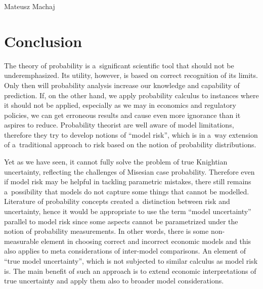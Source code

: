 \begin{artengenv}{Mateusz Machaj}
\section{Conclusion}

The theory of probability is a~significant scientific tool that should not be underemphasized. Its utility, however, is based on correct recognition of its limits. Only then will probability analysis increase our knowledge and capability of prediction. If, on the other hand, we apply probability calculus to instances where it should not be applied, especially as we may in economics and regulatory policies, we can get erroneous results and cause even more ignorance than it aspires to reduce. Probability theorist are well aware of model limitations, therefore they try to develop notions of ``model risk'', which is in a~way extension of a~traditional approach to risk based on the notion of probability distributions.



Yet as we have seen, it cannot fully solve the problem of true Knightian uncertainty, reflecting the challenges of Misesian case probability. Therefore even if model risk may be helpful in tackling parametric mistakes, there still remains a~possibility that models do not capture some things that cannot be modelled. Literature of probability concepts created a~distinction between risk and uncertainty, hence it would be appropriate to use the term ``model uncertainty'' parallel to model risk since some aspects cannot be parametrized under the notion of probability measurements. In other words, there is some non-measurable element in choosing correct and incorrect economic models and this also applies to meta considerations of inter-model comparisons. An element of ``true model uncertainty'', which is not subjected to similar calculus as model risk is. The main benefit of such an approach is to extend economic interpretations of true uncertainty and apply them also to broader model considerations.







\end{artengenv}

\label{machaj-lastpage}